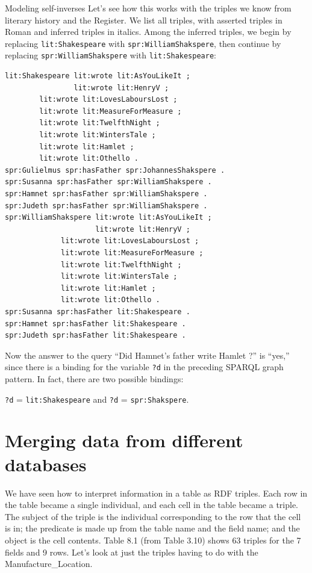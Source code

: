 \begin{challenge}{Modeling self-inverses}
Let's see how this works with the triples we know from literary history
and the Register. We list all triples, with asserted triples in Roman
and inferred triples in italics. Among the inferred triples, we
begin by replacing \texttt{lit:Shakespeare} with \texttt{spr:WilliamShakspere}, then
continue by replacing \texttt{spr:WilliamShakspere} with \texttt{lit:Shakespeare}:

\begin{lstlisting}
lit:Shakespeare lit:wrote lit:AsYouLikeIt ;
                lit:wrote lit:HenryV ;
		lit:wrote lit:LovesLaboursLost ;
		lit:wrote lit:MeasureForMeasure ;
		lit:wrote lit:TwelfthNight ;
		lit:wrote lit:WintersTale ;
		lit:wrote lit:Hamlet ;
		lit:wrote lit:Othello .
spr:Gulielmus spr:hasFather spr:JohannesShakspere .
spr:Susanna spr:hasFather spr:WilliamShakspere .
spr:Hamnet spr:hasFather spr:WilliamShakspere .
spr:Judeth spr:hasFather spr:WilliamShakspere .
spr:WilliamShakspere lit:wrote lit:AsYouLikeIt ;  
                     lit:wrote lit:HenryV ;
		     lit:wrote lit:LovesLaboursLost ;
		     lit:wrote lit:MeasureForMeasure ;
		     lit:wrote lit:TwelfthNight ;
		     lit:wrote lit:WintersTale ;
		     lit:wrote lit:Hamlet ;
		     lit:wrote lit:Othello .
spr:Susanna spr:hasFather lit:Shakespeare .
spr:Hamnet spr:hasFather lit:Shakespeare .
spr:Judeth spr:hasFather lit:Shakespeare .
\end{lstlisting}

Now the answer to the query ``Did Hamnet's father write Hamlet ?'' is
``yes,'' since there is a binding for the variable \texttt{?d} in the preceding
SPARQL graph pattern. In fact, there are two possible bindings:

\texttt{?d} = \texttt{lit:Shakespeare} and \texttt{?d} = \texttt{spr:Shakspere}.
\end{challenge}


\section{Merging data from different databases}

We have seen how to interpret information in a table as RDF triples.
Each row in the table became a single individual, and each cell in the
table became a triple. The subject of the triple is the individual
corresponding to the row that the cell is in; the predicate is made up
from the table name and the field name; and the object is the cell
contents. Table 8.1 (from Table 3.10) shows
63 triples for the 7 fields and 9 rows. Let's look at just the triples
having to do with the
Manufacture\_Location.

